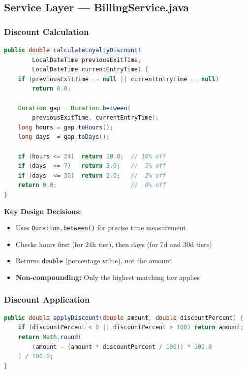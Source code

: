 \documentclass[12pt,a4paper]{article}
\begin{document}
\subsection{Service Layer — BillingService.java}

\subsubsection{Discount Calculation}

\begin{lstlisting}[language=Java, caption={Loyalty Discount Calculation}]
public double calculateLoyaltyDiscount(
        LocalDateTime previousExitTime, 
        LocalDateTime currentEntryTime) {
    if (previousExitTime == null || currentEntryTime == null) 
        return 0.0;
    
    Duration gap = Duration.between(
        previousExitTime, currentEntryTime);
    long hours = gap.toHours();
    long days  = gap.toDays();

    if (hours <= 24)  return 10.0;  // 10% off
    if (days  <= 7)   return 5.0;   //  5% off
    if (days  <= 30)  return 2.0;   //  2% off
    return 0.0;                     //  0% off
}
\end{lstlisting}

\textbf{Key Design Decisions:}
\begin{itemize}[noitemsep]
    \item Uses \texttt{Duration.between()} for precise time measurement
    \item Checks hours first (for 24h tier), then days (for 7d and 30d tiers)
    \item Returns \texttt{double} (percentage value), not the amount
    \item \textbf{Non-compounding:} Only the highest matching tier applies
\end{itemize}

\subsubsection{Discount Application}

\begin{lstlisting}[language=Java, caption={Apply Discount to Amount}]
public double applyDiscount(double amount, double discountPercent) {
    if (discountPercent < 0 || discountPercent > 100) return amount;
    return Math.round(
        (amount - (amount * discountPercent / 100)) * 100.0
    ) / 100.0;
}
\end{lstlisting}
\end{document}
